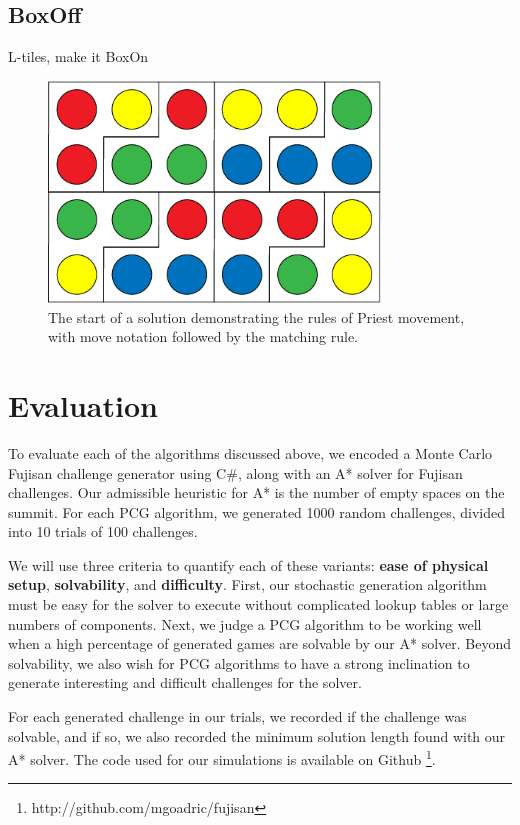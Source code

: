 \documentclass[journal]{IEEEtran}
\begin{document}
\subsection{BoxOff}

L-tiles, make it BoxOn

\begin{figure}[t]
\centering
\includegraphics[width=8.8cm]{boxon4x6.png}
\caption{The start of a solution demonstrating the rules of Priest movement, with move notation followed by the matching rule. }
\label{fig:priestrules}
\end{figure}



\section{Evaluation}

 \noindent
To evaluate each of the algorithms discussed above, we encoded a Monte Carlo Fujisan challenge generator using C\#, along with an A* solver for Fujisan challenges. Our admissible heuristic for A* is the number of empty spaces on the summit. For each PCG algorithm, we generated 1000 random challenges, divided into 10 trials of 100 challenges. 

We will use three criteria to quantify each of these variants:
{\bf ease of physical setup}, {\bf solvability}, and {\bf difficulty}.  First, our stochastic 
generation algorithm must be easy for the solver to execute without complicated lookup tables or large numbers of components. Next, we judge a PCG algorithm to be working well when a high percentage of generated games are solvable by our A* solver. Beyond solvability, we also wish for PCG algorithms to have a strong inclination to generate interesting and difficult challenges for the solver. 

For each generated challenge in our trials, we recorded if the challenge was solvable, and if so, we also recorded the minimum solution length found with our A* solver. The code used for our simulations is available on Github \footnote{http://github.com/mgoadric/fujisan}. 
\end{document}

